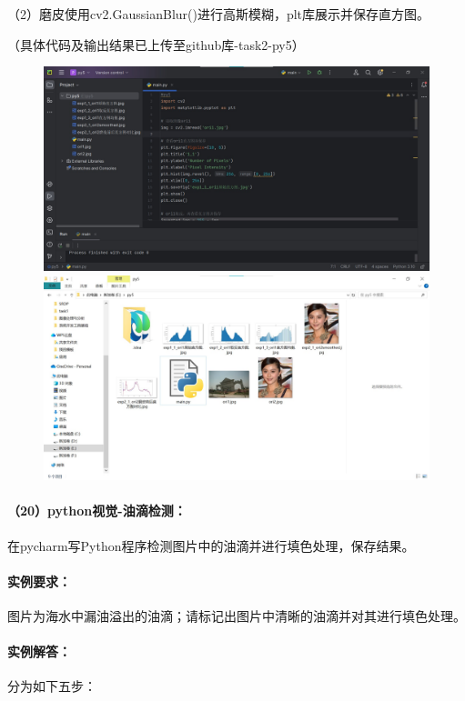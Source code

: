 \documentclass[a4paper, 12pt]{article}
\begin{document}
	（2）磨皮使用cv2.GaussianBlur()进行高斯模糊，plt库展示并保存直方图。

	（具体代码及输出结果已上传至github库-task2-py5）

	\begin{figure}[H]
		\centering
		\includegraphics[width=1\textwidth]{037.jpg}
		\includegraphics[width=1\textwidth]{038.jpg}
	\end{figure}
	
	\paragraph{（20）python视觉-油滴检测：}
	在pycharm写Python程序检测图片中的油滴并进行填色处理，保存结果。
	
	\paragraph{实例要求：}
	图片为海水中漏油溢出的油滴；请标记出图片中清晰的油滴并对其进行填色处理。
	
	\paragraph{实例解答：}
	分为如下五步：
	
\end{document}
